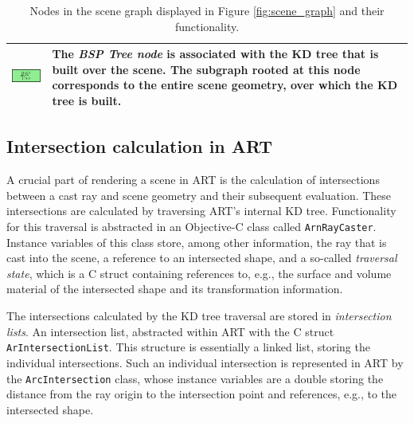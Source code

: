 \begin{table}
{\begin{tabular}{m{3cm}m{8cm}}
      \midrule
     \includegraphics[scale=0.5]{img/2 art/bsp_node.png} & The \emph{BSP Tree node} is associated with the KD tree that is built over the scene. The subgraph rooted at this node corresponds to the entire scene geometry, over which the KD tree is built.
      \\
      \bottomrule
    \end{tabular}}
  \caption{Nodes in the scene graph displayed in Figure \ref{fig:scene_graph} and their functionality.}
  \label{tab:nodes}
\end{table}


\subsection{Intersection calculation in ART}
\label{sec:art_raytracing}

A crucial part of rendering a scene in ART is the calculation of intersections between a cast ray and scene geometry and their subsequent evaluation. These intersections are calculated by traversing ART's internal KD tree.  Functionality for this traversal is abstracted in an Objective-C class called \texttt{ArnRayCaster}. Instance variables of this class store, among other information, the ray that is cast into the scene, a reference to an intersected shape, and a so-called \emph{traversal state}, which is a C struct containing references to, e.g., the surface and volume material of the intersected shape and its transformation information.

The intersections calculated by the KD tree traversal are stored in \emph{intersection lists}. An intersection list, abstracted within ART with the C struct \texttt{ArIntersectionList}. This structure is essentially a linked list, storing the individual intersections. Such an individual intersection is represented in ART by the \texttt{ArcIntersection} class, whose instance variables are a double storing the distance from the ray origin to the intersection point and references, e.g., to the intersected shape. 

